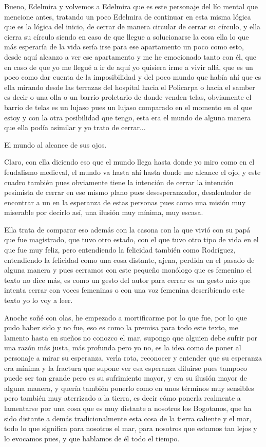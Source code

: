 Bueno, Edelmira y volvemos a Edelmira que es este personaje del lío mental que mencione antes, tratando un poco Edelmira de continuar en esta misma lógica que es la lógica del inicio, de cerrar de manera circular de cerrar su círculo, y ella cierra su círculo siendo en caso de que llegue a solucionarse la cosa ella lo que más esperaría de la vida sería irse para ese apartamento un poco como esto, desde aquí alcanzo a ver ese apartamento y me he emocionado tanto con él, que en caso de que yo me llegué a ir de aquí yo quisiera irme a vivir allá, que es un poco como dar cuenta de la imposibilidad y del poco mundo que había ahí que es ella mirando desde las terrazas del hospital hacia el Policarpa o hacia el samber es decir o una olla o un barrio proletario de donde venden telas, obviamente el barrio de telas es un lujaso pues un lujaso comparado en el momento en el que estoy y con la otra posibilidad que tengo, esta era el mundo de alguna manera que ella podía asimilar y yo trato de cerrar... 

El mundo al alcance de sus ojos.

Claro, con ella diciendo eso que el mundo llega hasta donde yo miro como en el feudalismo medieval, el mundo va hasta ahí hasta donde me alcance el ojo, y este cuadro también pues obviamente tiene la intención de cerrar la intención pesimista de cerrar en ese mismo plano pues desesperanzador, desalentador de encontrar a un en la esperanza de estas personas pues como una misión muy miserable por decirlo así, una ilusión muy mínima, muy escasa.

Ella trata de comparar eso además con la casona con la que vivió con su papá que fue magistrado, que tuvo otro estado, con el que tuvo otro tipo de vida en el que fue muy feliz, pero entendiendo la felicidad también como Rodríguez, entendiendo la felicidad como una cosa distante, ajena, perdida en el pasado de alguna manera y pues cerramos con este pequeño monólogo que es femenino el texto no dice más, es como un gesto del autor para cerrar es un gesto mío que intenta cerrar con voces femeninas o con una voz femenina describiendo este texto yo lo voy a leer.

Anoche soñé con olas, he empezado a mortificarme por lo que fue, por lo que pudo haber sido y no fue, eso es como la premisa para todo este texto, me lamento hasta en sueños no conozco el mar, supongo que alguien debe sufrir por una razón más justa, más profunda pero yo no, es la idea como de poner al personaje a mirar su esperanza, verla rota, reconocer y entender que su esperanza era mínima y la fractura que supone ver esa esperanza diluirse pues tampoco puede ser tan grande pero es su sufrimiento mayor, y era su ilusión mayor de alguna manera, y quería también ponerlo como en unos términos muy sensibles pero también muy aterrizado a la tierra, es decir cómo ponerla realmente a lamentarse por una cosa que es muy distante a nosotros los Bogotanos, que ha sido distante a demás tradicionalmente esta cosa de la tierra caliente y el mar, todo lo que significa para nosotros el mar, para nosotros que estamos tan lejos y lo evocamos pues, y que hablamos de él  todo el tiempo.

